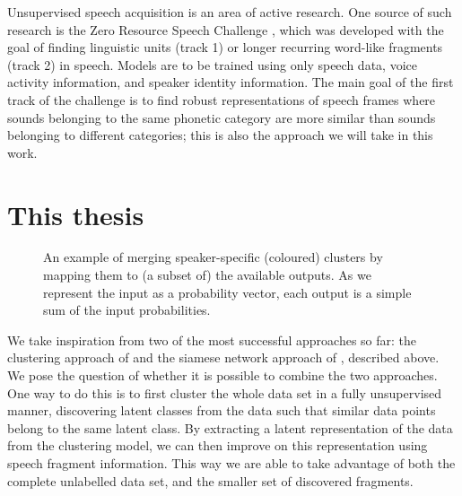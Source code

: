 Unsupervised speech acquisition is an area of active research.
One source of such research is the Zero Resource Speech Challenge \parencite{versteegh2015zero}, which was developed with the goal of finding linguistic units (track 1) or longer recurring word-like fragments (track 2) in speech.
Models are to be trained using only speech data, voice activity information, and speaker identity information.
The main goal of the first track of the challenge is to find robust representations of speech frames where sounds belonging to the same phonetic category are more similar than sounds belonging to different categories; this is also the approach we will take in this work.



\section{This thesis}

\begin{figure}
  \centering

  \caption{\label{fig:mapping}An example of merging speaker-specific (coloured) clusters by mapping them to (a subset of) the available outputs.
  As we represent the input as a probability vector, each output is a simple sum of the input probabilities.}
\end{figure}

We take inspiration from two of the most successful approaches so far: the clustering approach of \textcite{chen2015parallel} and the siamese network approach of \textcite{thiolliere2015hybrid}, described above.
We pose the question of whether it is possible to combine the two approaches.
One way to do this is to first cluster the whole data set in a fully unsupervised manner, discovering latent classes from the data such that similar data points belong to the same latent class.
By extracting a latent representation of the data from the clustering model, we can then improve on this representation using speech fragment information.
This way we are able to take advantage of both the complete unlabelled data set, and the smaller set of discovered fragments.


